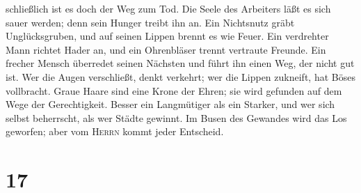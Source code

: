 schließlich ist es doch der Weg zum Tod.  Die Seele des
Arbeiters läßt es sich sauer werden; denn sein Hunger treibt ihn an.
 Ein Nichtsnutz gräbt Unglücksgruben, und auf seinen
Lippen brennt es wie Feuer.  Ein verdrehter Mann richtet
Hader an, und ein Ohrenbläser trennt vertraute Freunde. 
Ein frecher Mensch überredet seinen Nächsten und führt ihn einen Weg,
der nicht gut ist.  Wer die Augen verschließt, denkt
verkehrt; wer die Lippen zukneift, hat Böses vollbracht. 
Graue Haare sind eine Krone der Ehren; sie wird gefunden auf dem Wege
der Gerechtigkeit.  Besser ein Langmütiger als ein
Starker, und wer sich selbst beherrscht, als wer Städte gewinnt.
 Im Busen des Gewandes wird das Los geworfen; aber vom
\textsc{Herrn} kommt jeder Entscheid.

\hypertarget{section-16}{%
\section{17}\label{section-16}}

